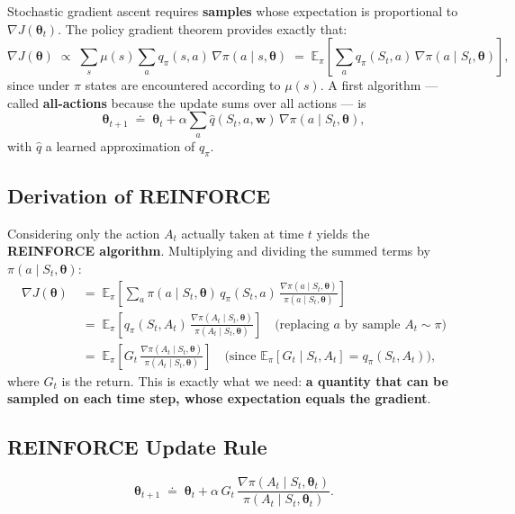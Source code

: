 \documentclass[11pt,a4paper]{article}
\theoremstyle{definition}
\theoremstyle{plain}
\theoremstyle{remark}
\begin{document}
Stochastic gradient ascent requires \textbf{samples} whose expectation is proportional to $\nabla J(\boldsymbol{\theta}_t)$. The policy gradient theorem provides exactly that:
\[
    \nabla J(\boldsymbol{\theta}) \;\propto\; \sum_s \mu(s) \sum_a q_\pi(s, a)\, \nabla \pi(a \mid s, \boldsymbol{\theta}) \;=\; \mathbb{E}_\pi\!\left[\sum_a q_\pi(S_t, a)\, \nabla \pi(a \mid S_t, \boldsymbol{\theta})\right],
\]
since under $\pi$ states are encountered according to $\mu(s)$. A first algorithm — called \textbf{all-actions} because the update sums over all actions — is
\[
    \boldsymbol{\theta}_{t+1} \;\doteq\; \boldsymbol{\theta}_t + \alpha \sum_a \hat{q}(S_t, a, \mathbf{w})\, \nabla \pi(a \mid S_t, \boldsymbol{\theta}),
\]
with $\hat{q}$ a learned approximation of $q_\pi$.

\subsection{Derivation of REINFORCE}

Considering only the action $A_t$ actually taken at time $t$ yields the \textbf{REINFORCE algorithm}. Multiplying and dividing the summed terms by $\pi(a \mid S_t, \boldsymbol{\theta})$:
\begin{align*}
    \nabla J(\boldsymbol{\theta}) \;&=\; \mathbb{E}_\pi\!\left[\sum_a \pi(a \mid S_t, \boldsymbol{\theta})\, q_\pi(S_t, a)\, \frac{\nabla \pi(a \mid S_t, \boldsymbol{\theta})}{\pi(a \mid S_t, \boldsymbol{\theta})}\right] \\
                                  &=\; \mathbb{E}_\pi\!\left[q_\pi(S_t, A_t)\, \frac{\nabla \pi(A_t \mid S_t, \boldsymbol{\theta})}{\pi(A_t \mid S_t, \boldsymbol{\theta})}\right] \quad \text{(replacing } a \text{ by sample } A_t \sim \pi\text{)} \\
                                  &=\; \mathbb{E}_\pi\!\left[G_t\, \frac{\nabla \pi(A_t \mid S_t, \boldsymbol{\theta})}{\pi(A_t \mid S_t, \boldsymbol{\theta})}\right] \quad \text{(since } \mathbb{E}_\pi[G_t \mid S_t, A_t] = q_\pi(S_t, A_t)\text{)},
\end{align*}
where $G_t$ is the return. This is exactly what we need: \textbf{a quantity that can be sampled on each time step, whose expectation equals the gradient}.

\subsection{REINFORCE Update Rule}

\begin{tcolorbox}[colback=red!5!white, colframe=red!70!black, title={REINFORCE Update Rule}]
\[
    \boldsymbol{\theta}_{t+1} \;\doteq\; \boldsymbol{\theta}_t + \alpha\, G_t\, \frac{\nabla \pi(A_t \mid S_t, \boldsymbol{\theta}_t)}{\pi(A_t \mid S_t, \boldsymbol{\theta}_t)}.
\]
\end{tcolorbox}
\end{document}
